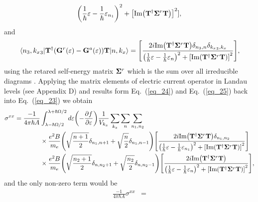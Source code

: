 \begin{widetext}
\begin{equation}
  {
  \qty(
  \frac{1}{\hbar}\varepsilon -
  \frac{1}{\hbar}\varepsilon_{n_1}
  )^2
  + \qty[\text{Im}\qty(\vb{T}^{\dagger} \vb{\Sigma}^r \vb{T})]^2
  }],
\end{equation}
and
\begin{equation} \label{eq_25}
  \mel{{n_3,{k_x}_3}}{
  \vb{T}^{\dagger}
  \qty(
  \vb{G}^{r} (\varepsilon) - \vb{G}^{a} (\varepsilon)
  )\vb{T}}
  {n,{k_x}} =
  \qty[
  \frac{2i \text{Im}\qty(\vb{T}^{\dagger} \vb{\Sigma}^r \vb{T})
  \delta_{n_3,n}\delta_{{k_x}_3,{k_x}}}
  {
  \qty(
  \frac{1}{\hbar}\varepsilon -
  \frac{1}{\hbar}\varepsilon_{n}
  )^2
  + \qty[\text{Im}\qty(\vb{T}^{\dagger} \vb{\Sigma}^r \vb{T})]^2
  }],
\end{equation}
using the retared self-energy matrix $\vb{\Sigma}^r$ which is the sum over all irreducible diagrams \cite{wackerl20,wackerlthesis20}. Applying the matrix elements of electric current operator in Landau levels (see Appendix D) and
results form Eq.~(\ref{eq_24}) and Eq.~(\ref{eq_25}) back into Eq.~(\ref{eq_23}) we obtain
\begin{equation} \label{eq_26}
  \begin{aligned}
    {\sigma}^{xx}  =
    \frac{-1}{4\pi\hbar A} &
    \int_{\lambda-\hbar\Omega/2}^{\lambda+ \hbar\Omega/2} d\varepsilon
    \qty(
    -\frac{\partial f}{\partial \varepsilon})
    \frac{1}{V_{k_x}} \sum_{k_x} \sum_{n}
    \sum_{n_1,n_2}
    \\
    & \times
    \frac{e^2B}{{m_e}}
    \qty(\sqrt{\frac{n+1}{2}} \delta_{n_1,n+1} + \sqrt{\frac{n}{2}}
    \delta_{n_1,n-1})
    \qty[
    \frac{2i \text{Im}\qty(\vb{T}^{\dagger} \vb{\Sigma}^r \vb{T})
    \delta_{n_1,n_2}}
    {
    \qty(
    \frac{1}{\hbar}\varepsilon -
    \frac{1}{\hbar}\varepsilon_{n_1}
    )^2
    + \qty[\text{Im}\qty(\vb{T}^{\dagger} \vb{\Sigma}^r \vb{T})]^2
    }] \\
    & \times
    \frac{e^2B}{{m_e}}
    \qty(\sqrt{\frac{n_2+1}{2}} \delta_{n,n_2+1} + \sqrt{\frac{n_2}{2}}
    \delta_{n,n_2-1})
    \qty[
    \frac{2i \text{Im}\qty(\vb{T}^{\dagger} \vb{\Sigma}^r \vb{T})
    }
    {
    \qty(
    \frac{1}{\hbar}\varepsilon -
    \frac{1}{\hbar}\varepsilon_{n}
    )^2
    + \qty[\text{Im}\qty(\vb{T}^{\dagger} \vb{\Sigma}^r \vb{T})]^2
    }],
  \end{aligned}
\end{equation}
and the only non-zero term would be
\begin{equation} \label{eq_27}
  \begin{aligned}
    \frac{-1}{4\pi\hbar A}
    {\sigma}^{xx} & =

\end{aligned}
\end{equation}
\end{widetext}
